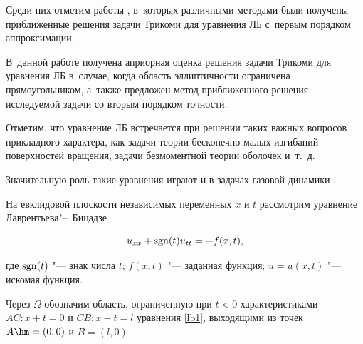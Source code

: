 Среди них отметим работы \cite{balk:c14, balk:c15, balk:c16, balk:c17, balk:c18, balk:c19}, в~которых различными методами были получены приближенные решения задачи Трикоми для уравнения ЛБ с~первым порядком аппроксимации. 

В~данной работе получена априорная оценка решения задачи Трикоми для уравнения ЛБ в~случае, когда область эллиптичности ограничена прямоугольником, а~также предложен метод приближенного решения исследуемой задачи со вторым порядком точности. 

Отметим, что уравнение ЛБ  встречается при решении таких важных вопросов прикладного характера, как задачи теории бесконечно малых изгибаний поверхностей вращения, задачи безмоментной теории оболочек и~т.~д. 

Значительную роль такие уравнения играют и в задачах газовой динамики \cite{balk:c20}. 



\smallskip




На евклидовой плоскости независимых переменных $x$ и $t$ рассмотрим уравнение Лаврентьева"--~Бицадзе

\begin{equation}

\label{lb1}

u_{xx}+\mathop{\rm sgn}(t)u_{tt}=-f(x, t), 

\end{equation}

где $\mathop{\rm sgn}(t)$ "--- знак числа $t$; $f(x, t)$ "--- заданная функция; $u=u(x,t)$ "--- искомая функция.














Через $\Omega$ обозначим область, ограниченную при $t<0$ характеристиками $AC: x+t=0$ и $CB: x-t=l$ уравнения \eqref{lb1}, выходящими из точек \linebreak $A\hm =(0, 0)$ и $B=(l, 0)$ 

